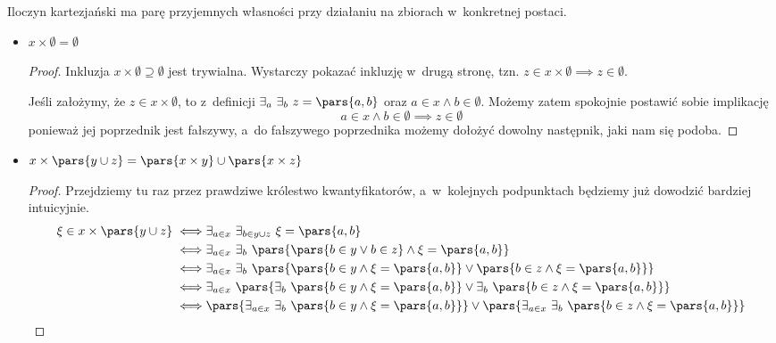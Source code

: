 Iloczyn kartezjański ma parę przyjemnych własności przy działaniu na zbiorach w~konkretnej postaci.
\begin{itemize}
    \item \(x \times \emptyset = \emptyset\)
        \begin{proof}
            Inkluzja \(x \times \emptyset \supseteq \emptyset\) jest trywialna. Wystarczy pokazać inkluzję w~drugą stronę, tzn. \(z \in x \times \emptyset \implies z \in \emptyset\). 
            
            Jeśli założymy, że \(z \in x \times \emptyset\), to z~definicji \(\exists_a \ \exists_b \ z = \pars{a, b}\) oraz \(a \in x \land b \in \emptyset\). Możemy zatem spokojnie postawić sobie implikację
            \begin{equation*}
                a \in x \land b \in \emptyset \implies z \in \emptyset
            \end{equation*}
            ponieważ jej poprzednik jest fałszywy, a~do fałszywego poprzednika możemy dołożyć dowolny następnik, jaki nam się podoba.
        \end{proof}
    \item \(x \times \pars{y \cup z} = \pars{x \times y} \cup \pars{x \times z}\)
        \begin{proof}
            Przejdziemy tu raz przez prawdziwe królestwo kwantyfikatorów, a~w~kolejnych podpunktach będziemy już dowodzić bardziej intuicyjnie.
            \begin{equation*}
                \begin{split}
                    \xi \in x \times \pars{y \cup z}
                        \iff& \exists_{a \in x} \ \exists_{b \in y \cup z} \ \xi = \pars{a, b} \\
                        \iff& \exists_{a \in x} \ \exists_b \ \pars{\pars{b \in y \lor b \in z} \land \xi = \pars{a, b}} \\
                        \iff& \exists_{a \in x} \ \exists_b \ \pars{\pars{b \in y \land \xi = \pars{a, b}} \lor \pars{b \in z \land \xi = \pars{a, b}}} \\
                        \iff& \exists_{a \in x} \ \pars{\exists_b \ \pars{b \in y \land \xi = \pars{a, b}} \lor \exists_b \ \pars{b \in z \land \xi = \pars{a, b}}} \\
                        \iff& \pars{\exists_{a \in x} \ \exists_b \ \pars{b \in y \land \xi = \pars{a, b}}} \lor \pars{\exists_{a \in x} \ \exists_b \ \pars{b \in z \land \xi = \pars{a, b}}} \\

\end{split}
\end{equation*}
\end{proof}
\end{itemize}
